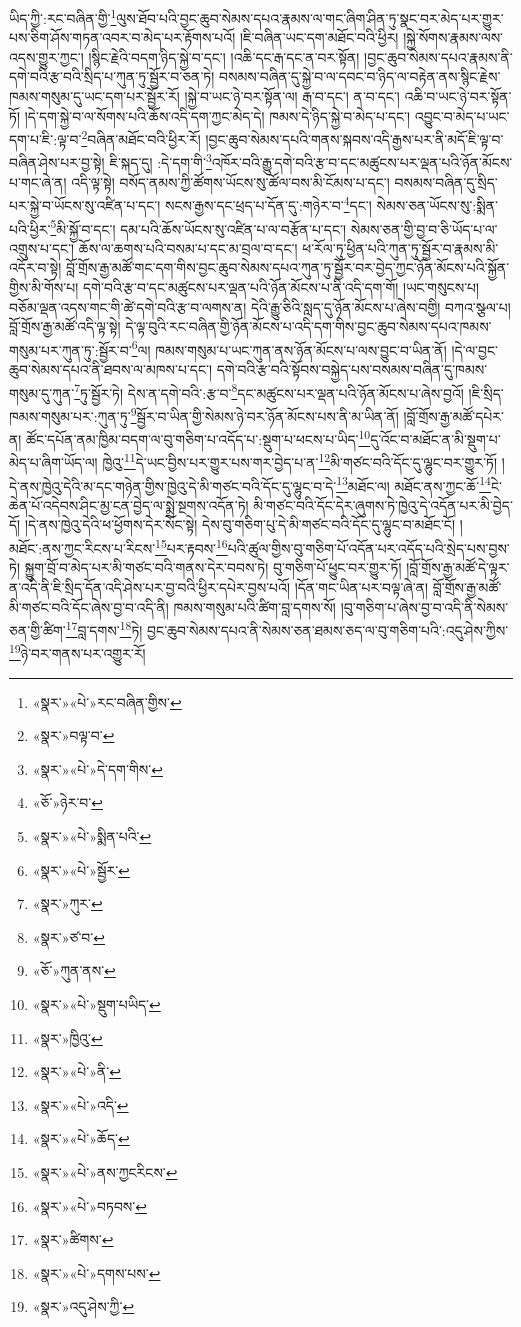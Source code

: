 ཡིད་ཀྱི་:རང་བཞིན་གྱི་\footnote{«སྣར་»«པེ་»རང་བཞིན་གྱིས་}ལུས་ཐོབ་པའི་བྱང་ཆུབ་སེམས་དཔའ་རྣམས་ལ་གང་ཞིག་ཤིན་ཏུ་སྣང་བར་མེད་པར་གྱུར་པས་ཅིག་ཤོས་གཏན་འབར་བ་མེད་པར་རྟོགས་པའོ། །ཇི་བཞིན་ཡང་དག་མཐོང་བའི་ཕྱིར། །སྐྱེ་སོགས་རྣམས་ལས་འདས་གྱུར་ཀྱང་། །སྙིང་རྗེའི་བདག་ཉིད་སྐྱེ་བ་དང་། །འཆི་དང་རྒ་དང་ན་བར་སྟོན། །བྱང་ཆུབ་སེམས་དཔའ་རྣམས་ནི་དགེ་བའི་རྩ་བའི་སྲིད་པ་ཀུན་ཏུ་སྦྱོར་བ་ཅན་ཏེ། བསམས་བཞིན་དུ་སྐྱེ་བ་ལ་དབང་བ་ཉིད་ལ་བརྟེན་ནས་སྙིང་རྗེས་ཁམས་གསུམ་དུ་ཡང་དག་པར་སྦྱོར་རོ། །སྐྱེ་བ་ཡང་ཉེ་བར་སྟོན་ལ། རྒ་བ་དང་། ན་བ་དང་། འཆི་བ་ཡང་ཉེ་བར་སྟོན་ཏོ། །དེ་དག་སྐྱེ་བ་ལ་སོགས་པའི་ཆོས་འདི་དག་ཀྱང་མེད་དེ། ཁམས་དེ་ཉིད་སྐྱེ་བ་མེད་པ་དང་། འབྱུང་བ་མེད་པ་ཡང་དག་པ་ཇི་:ལྟ་བ་\footnote{«སྣར་»བལྟ་བ་}བཞིན་མཐོང་བའི་ཕྱིར་རོ། །བྱང་ཆུབ་སེམས་དཔའི་གནས་སྐབས་འདི་རྒྱས་པར་ནི་མདོ་ཇི་ལྟ་བ་བཞིན་ཤེས་པར་བྱ་སྟེ། ཇི་སྐད་དུ། :དེ་དག་གི་\footnote{«སྣར་»«པེ་»དེ་དག་གིས་}འཁོར་བའི་རྒྱུ་དགེ་བའི་རྩ་བ་དང་མཚུངས་པར་ལྡན་པའི་ཉོན་མོངས་པ་གང་ཞེ་ན། འདི་ལྟ་སྟེ། བསོད་ནམས་ཀྱི་ཚོགས་ཡོངས་སུ་ཚོལ་བས་མི་ངོམས་པ་དང་། བསམས་བཞིན་དུ་སྲིད་པར་སྐྱེ་བ་ཡོངས་སུ་འཛིན་པ་དང་། སངས་རྒྱས་དང་ཕྲད་པ་དོན་དུ་:གཉེར་བ་\footnote{«ཅོ་»ཉེར་བ་}དང་། སེམས་ཅན་ཡོངས་སུ་:སྨིན་པའི་ཕྱིར་\footnote{«སྣར་»«པེ་»སྨིན་པའི་}མི་སྐྱོ་བ་དང་། དམ་པའི་ཆོས་ཡོངས་སུ་འཛིན་པ་ལ་བརྩོན་པ་དང་། སེམས་ཅན་གྱི་བྱ་བ་ཅི་ཡོད་པ་ལ་འགྲུས་པ་དང་། ཆོས་ལ་ཆགས་པའི་བསམ་པ་དང་མ་བྲལ་བ་དང་། ཕ་རོལ་ཏུ་ཕྱིན་པའི་ཀུན་ཏུ་སྦྱོར་བ་རྣམས་མི་འདོར་བ་སྟེ། བློ་གྲོས་རྒྱ་མཚོ་གང་དག་གིས་བྱང་ཆུབ་སེམས་དཔའ་ཀུན་ཏུ་སྦྱོར་བར་བྱེད་ཀྱང་ཉོན་མོངས་པའི་སྐྱོན་གྱིས་མི་གོས་པ། དགེ་བའི་རྩ་བ་དང་མཚུངས་པར་ལྡན་པའི་ཉོན་མོངས་པ་ནི་འདི་དག་གོ། །ཡང་གསུངས་པ། བཅོམ་ལྡན་འདས་གང་གི་ཚེ་དགེ་བའི་རྩ་བ་ལགས་ན། དེའི་རྒྱུ་ཅིའི་སླད་དུ་ཉོན་མོངས་པ་ཞེས་བགྱི། བཀའ་སྩལ་པ། བློ་གྲོས་རྒྱ་མཚོ་འདི་ལྟ་སྟེ། དེ་ལྟ་བུའི་རང་བཞིན་གྱི་ཉོན་མོངས་པ་འདི་དག་གིས་བྱང་ཆུབ་སེམས་དཔའ་ཁམས་གསུམ་པར་ཀུན་ཏུ་:སྦྱོར་བ་\footnote{«སྣར་»«པེ་»སྦྱོར་}ལ། ཁམས་གསུམ་པ་ཡང་ཀུན་ནས་ཉོན་མོངས་པ་ལས་བྱུང་བ་ཡིན་ནོ། །དེ་ལ་བྱང་ཆུབ་སེམས་དཔའ་ནི་ཐབས་ལ་མཁས་པ་དང་། དགེ་བའི་རྩ་བའི་སྟོབས་བསྐྱེད་པས་བསམས་བཞིན་དུ་ཁམས་གསུམ་དུ་ཀུན་\footnote{«སྣར་»ཀུར་}ཏུ་སྦྱོར་ཏེ། དེས་ན་དགེ་བའི་:རྩ་བ་\footnote{«སྣར་»ཙ་བ་}དང་མཚུངས་པར་ལྡན་པའི་ཉོན་མོངས་པ་ཞེས་བྱའོ། །ཇི་སྲིད་ཁམས་གསུམ་པར་:ཀུན་ཏུ་\footnote{«ཅོ་»ཀུན་ནས་}སྦྱོར་བ་ཡིན་གྱི་སེམས་ཉེ་བར་ཉོན་མོངས་པས་ནི་མ་ཡིན་ནོ། །བློ་གྲོས་རྒྱ་མཚོ་དཔེར་ན། ཚོང་དཔོན་ནམ་ཁྱིམ་བདག་ལ་བུ་གཅིག་པ་འདོད་པ་:སྡུག་པ་ཕངས་པ་ཡིད་\footnote{«སྣར་»«པེ་»སྡུག་པཡིད་}དུ་འོང་བ་མཐོང་ན་མི་སྡུག་པ་མེད་པ་ཞིག་ཡོད་ལ། ཁྱེའུ་\footnote{«སྣར་»ཁྱིའུ་}དེ་ཡང་བྱིས་པར་གྱུར་པས་གར་བྱེད་པ་ན་\footnote{«སྣར་»«པེ་»ནི་}མི་གཙང་བའི་དོང་དུ་ལྷུང་བར་གྱུར་ཏོ། །དེ་ནས་ཁྱེའུ་དེའི་མ་དང་གཉེན་གྱིས་ཁྱེའུ་དེ་མི་གཙང་བའི་དོང་དུ་ལྷུང་བ་དེ་\footnote{«སྣར་»«པེ་»འདི་}མཐོང་ལ། མཐོང་ནས་ཀྱང་ཆོ་\footnote{«སྣར་»«པེ་»ཆོད་}ངེ་ཆེན་པོ་འདེབས་ཤིང་མྱ་ངན་བྱེད་ལ་སྨྲེ་སྔགས་འདོན་ཏེ། མི་གཙང་བའི་དོང་དེར་ཞུགས་ཏེ་ཁྱེའུ་དེ་འདོན་པར་མི་བྱེད་དོ། །དེ་ནས་ཁྱེའུ་དེའི་ཕ་ཕྱོགས་དེར་སོང་སྟེ། དེས་བུ་གཅིག་པུ་དེ་མི་གཙང་བའི་དོང་དུ་ལྷུང་བ་མཐོང་ངོ། །མཐོང་:ནས་ཀྱང་རིངས་པ་རིངས་\footnote{«སྣར་»«པེ་»ནས་ཀྱངརིངས་}པར་རྟབས་\footnote{«སྣར་»«པེ་»བཏབས་}པའི་ཚུལ་གྱིས་བུ་གཅིག་པོ་འདོན་པར་འདོད་པའི་སྲེད་པས་བྱས་ཏེ། སྐྱུག་བྲོ་བ་མེད་པར་མི་གཙང་བའི་གནས་དེར་བབས་ཏེ། བུ་གཅིག་པོ་ཕྱུང་བར་གྱུར་ཏོ། །བློ་གྲོས་རྒྱ་མཚོ་དེ་ལྟར་ན་འདི་ནི་ཇི་སྲིད་དོན་འདི་ཤེས་པར་བྱ་བའི་ཕྱིར་དཔེར་བྱས་པའོ། །དོན་གང་ཡིན་པར་བལྟ་ཞེ་ན། བློ་གྲོས་རྒྱ་མཚོ་མི་གཙང་བའི་དོང་ཞེས་བྱ་བ་འདི་ནི། ཁམས་གསུམ་པའི་ཚིག་བླ་དགས་སོ། །བུ་གཅིག་པ་ཞེས་བྱ་བ་འདི་ནི་སེམས་ཅན་གྱི་ཚིག་\footnote{«སྣར་»ཚིགས་}བླ་དགས་\footnote{«སྣར་»«པེ་»དགས་པས་}ཏེ། བྱང་ཆུབ་སེམས་དཔའ་ནི་སེམས་ཅན་ཐམས་ཅད་ལ་བུ་གཅིག་པའི་:འདུ་ཤེས་ཀྱིས་\footnote{«སྣར་»འདུ་ཤེས་ཀྱི་}ཉེ་བར་གནས་པར་འགྱུར་རོ། 